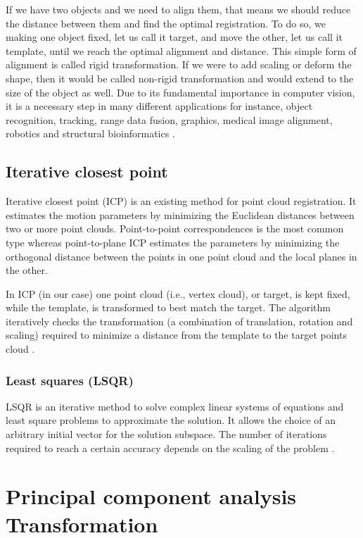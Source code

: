 \documentclass[../structure.tex]{subfiles}
\begin{document}
If we have two objects and we need to align them, that means we should reduce the distance between them and find the optimal registration. To do so, we making one object fixed, let us call it target, and move the other, let us call it template, until we reach the optimal alignment and distance. This simple form of alignment is called rigid transformation. If we were to add scaling or deform the shape, then it would be called non-rigid transformation and would extend to the size of the object as well. Due to its fundamental importance in computer vision, it is a necessary step in many different applications for instance, object recognition, tracking, range data fusion, graphics, medical image alignment, robotics and structural bioinformatics \cite{Li2007}.

		\subsection{Iterative closest point}
		
		Iterative closest point (ICP) is an existing method for point cloud registration.  It estimates the motion parameters by minimizing the Euclidean distances between two or more point clouds. Point-to-point correspondences is the most common type whereas point-to-plane ICP estimates the parameters by minimizing the orthogonal distance between the points in one point cloud and the local planes in the other.
		
In ICP (in our case) one point cloud (i.e., vertex cloud), or target, is kept fixed, while the template, is transformed to best match the target. The algorithm iteratively checks the transformation (a combination of translation, rotation and scaling) required to minimize a distance from the template to the target points cloud \cite{Zhang1994}.

		 \subsubsection{Least squares (LSQR)}
		
		 LSQR is an iterative method to solve complex linear systems of equations and least square problems to approximate the solution. It allows the choice of an arbitrary initial vector for the solution subspace. The number of iterations required to reach a certain accuracy depends on the scaling of the problem \cite{Paige1982a}.

\section{Principal component analysis Transformation}
\end{document}
